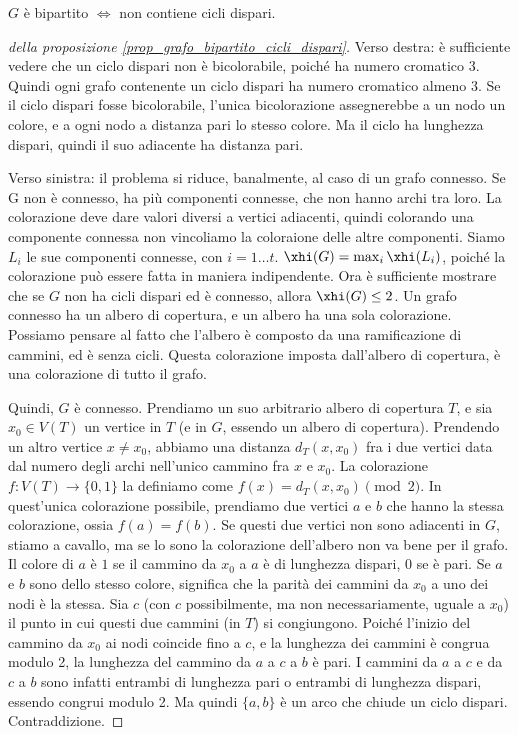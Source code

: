 \begin{prop}
	\label{prop_grafo_bipartito_cicli_dispari}
	$G$ \`e bipartito $\iff$ non contiene cicli dispari.
\end{prop}

\begin{proof}[della proposizione \ref{prop_grafo_bipartito_cicli_dispari}]
	Verso destra: \`e sufficiente vedere che un ciclo dispari non \`e bicolorabile, poich\'e ha numero cromatico 3.
	Quindi ogni grafo contenente un ciclo dispari ha numero cromatico almeno 3.
	Se il ciclo dispari fosse bicolorabile, l'unica bicolorazione assegnerebbe a un nodo un colore, e a ogni nodo a distanza pari lo stesso colore.
	Ma il ciclo ha lunghezza dispari, quindi il suo adiacente ha distanza pari.

	Verso sinistra: il problema si riduce, banalmente, al caso di un grafo connesso.
	Se G non \`e connesso, ha pi\`u componenti connesse, che non hanno archi tra loro.
	La colorazione deve dare valori diversi a vertici adiacenti, quindi colorando una componente connessa non vincoliamo la coloraione delle altre componenti.
	Siamo $L_i$ le sue componenti connesse, con $i = 1 \dots t$.
	$\xhi(G) = \max_{i} \xhi(L_i)$, poich\'e la colorazione pu\`o essere fatta in maniera indipendente.
	Ora \`e sufficiente mostrare che se $G$ non ha cicli dispari ed \`e connesso, allora $\xhi(G) \le 2$.
	Un grafo connesso ha un albero di copertura, e un albero ha una sola colorazione.
	Possiamo pensare al fatto che l'albero \`e composto da una ramificazione di cammini, ed \`e senza cicli.
	Questa colorazione imposta dall'albero di copertura, \`e una colorazione di tutto il grafo.

	Quindi, $G$ \`e connesso.
	Prendiamo un suo arbitrario albero di copertura $T$, e sia $x_0 \in V(T)$ un vertice in $T$ (e in $G$, essendo un albero di copertura).
	Prendendo un altro vertice $x \neq x_0$, abbiamo una distanza $d_T(x,x_0)$ fra i due vertici data dal numero degli archi nell'unico cammino fra $x$ e $x_0$.
	La colorazione $f : V(T) \to \{ 0, 1 \}$ la definiamo come $f(x) = d_T(x, x_0) \pmod{2}$.
	In quest'unica colorazione possibile, prendiamo due vertici $a$ e $b$ che hanno la stessa colorazione, ossia $f(a) = f(b)$.
	Se questi due vertici non sono adiacenti in $G$, stiamo a cavallo, ma se lo sono la colorazione dell'albero non va bene per il grafo.
	Il colore di $a$ \`e $1$ se il cammino da $x_0$ a $a$ \`e di lunghezza dispari, $0$ se \`e pari.
	Se $a$ e $b$ sono dello stesso colore, significa che la parit\`a dei cammini da $x_0$ a uno dei nodi \`e la stessa.
	Sia $c$ (con $c$ possibilmente, ma non necessariamente, uguale a $x_0$) il punto in cui questi due cammini (in $T$) si congiungono.
	Poich\'e l'inizio del cammino da $x_0$ ai nodi coincide fino a $c$, e la lunghezza dei cammini \`e congrua modulo 2, la lunghezza del cammino da $a$ a $c$ a $b$ \`e pari.
	I cammini da $a$ a $c$ e da $c$ a $b$ sono infatti entrambi di lunghezza pari o entrambi di lunghezza dispari, essendo congrui modulo 2.
	Ma quindi $\{a,b\}$ \`e un arco che chiude un ciclo dispari.
	Contraddizione.

\end{proof}

